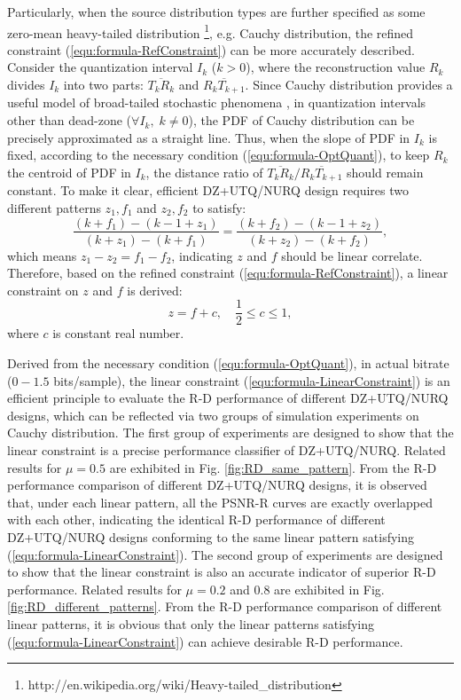 \documentclass[smallabstract,smallcaptions]{dccpaper}
\begin{document}
Particularly, when the source distribution types are further specified as some zero-mean heavy-tailed distribution \footnote{http://en.wikipedia.org/wiki/Heavy-tailed\_distribution}, e.g. Cauchy distribution, the refined constraint (\ref{equ:formula-RefConstraint}) can be more accurately described. Consider the quantization interval $I_k$ ($k > 0$), where the reconstruction value $R_k$ divides $I_k$ into two parts: $\overline{T_k R_k}$ and $\overline{R_k T_{k+1}}$. Since Cauchy distribution provides a useful model of broad-tailed stochastic phenomena \cite{Farvardin_TIT1984}, in quantization intervals other than dead-zone ($\forall I_k, \; k \ne 0$), the PDF of Cauchy distribution can be precisely approximated as a straight line. Thus, when the slope of PDF in $I_k$ is fixed, according to the necessary condition (\ref{equ:formula-OptQuant}), to keep $R_k$ the centroid of PDF in $I_k$, the distance ratio of $\overline{T_k R_k} / \overline{R_k T_{k+1}}$ should remain constant. To make it clear, efficient DZ+UTQ/NURQ design requires two different patterns $z_1, f_1$ and $z_2, f_2$ to satisfy:
\begin{equation}\label{equ:formula-ratio}
\frac{(k+f_1)-(k-1+z_1)}{(k+z_1)-(k+f_1)} = \frac{(k+f_2)-(k-1+z_2)}{(k+z_2)-(k+f_2)},
\end{equation}
which means $z_1 - z_2 = f_1 - f_2$, indicating $z$ and $f$ should be linear correlate. Therefore, based on the refined constraint (\ref{equ:formula-RefConstraint}), a linear constraint on $z$ and $f$ is derived:
\begin{equation}\label{equ:formula-LinearConstraint}
	z = f+c, \quad \frac{1}{2} \le c \le 1, 
\end{equation}
where $c$ is constant real number.

Derived from the necessary condition (\ref{equ:formula-OptQuant}), in actual bitrate ($0-1.5$ bits/sample), the linear constraint (\ref{equ:formula-LinearConstraint}) is an efficient principle to evaluate the R-D performance of different DZ+UTQ/NURQ designs, which can be reflected via two groups of simulation experiments on Cauchy distribution. The first group of experiments are designed to show that the linear constraint is a precise performance classifier of DZ+UTQ/NURQ. Related results for $\mu = 0.5$ are exhibited in Fig. \ref{fig:RD_same_pattern}. From the R-D performance comparison of different DZ+UTQ/NURQ designs, it is observed that, under each linear pattern, all the PSNR-R curves are exactly overlapped with each other, indicating the identical R-D performance of different DZ+UTQ/NURQ designs conforming to the same linear pattern satisfying (\ref{equ:formula-LinearConstraint}). The second group of experiments are designed to show that the linear constraint is also an accurate indicator of superior R-D performance. Related results for $\mu = 0.2$ and $0.8$ are exhibited in Fig. \ref{fig:RD_different_patterns}. From the R-D performance comparison of different linear patterns, it is obvious that only the linear patterns satisfying (\ref{equ:formula-LinearConstraint}) can achieve desirable R-D performance.
\end{document}
